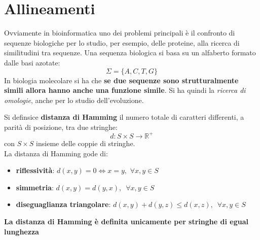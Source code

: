 \documentclass[a4paper,12pt, oneside]{book}
\begin{document}
\chapter{Allineamenti}
Ovviamente in bioinformatica uno dei problemi principali è il
confronto di sequenze biologiche per lo studio, per esempio, delle
proteine, alla ricerca di similitudini tra sequenze. Una sequenza
biologica si basa su un alfaberto formato dalle basi azotate:
\[\Sigma=\{A,C,T,G\}\]
In biologia molecolare si ha che \textbf{se due sequenze sono
  strutturalmente simili allora hanno anche una funzione simile}.
Si ha quindi la \textit{ricerca di omologie}, anche per lo studio
dell'evoluzione.
\begin{definizione}
  Si definsice \textbf{distanza di Hamming} il numero totale di
  caratteri differenti, a parità di posizione, tra due stringhe:
  \[d:S\times S\to\mathbb{R}^+\]
  con $S\times S$ insieme delle coppie di stringhe.\\
  La distanza di Hamming gode di:
  \begin{itemize}
    \item \textbf{riflessività}: $d(x,y)=0\Longleftrightarrow x=y,\,\,\forall
    x,y\in S$
    \item \textbf{simmetria}: $d(x,y)=d(y,x),\,\,\,\forall
    x,y\in S$
    \item \textbf{diseguaglianza triangolare}: $d(x,y)+d(y,z)\leq
    d(x,z),\,\,\,\forall x,y\in S$
  \end{itemize}
  \textbf{La distanza di Hamming è definita unicamente per stringhe di
  egual lunghezza}
\end{definizione}
\end{document}
